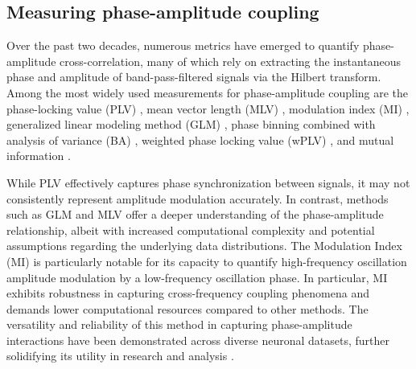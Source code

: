 \documentclass[../main.tex]{subfiles}
\begin{document}
\subsection{Measuring phase-amplitude coupling} 
Over the past two decades, numerous metrics have emerged to quantify phase-amplitude cross-correlation, many of which rely on extracting the instantaneous phase and amplitude of band-pass-filtered signals via the Hilbert transform.
Among the most widely used measurements for phase-amplitude coupling are the phase-locking value (PLV) \citep{mormann_phaseamplitude_2005, cohen_assessing_2008}, mean vector length (MLV) \citep{canolty_high_2006}, modulation index (MI) \citep{tort_dynamic_2008}, generalized linear modeling method (GLM) \citep{kramer_assessment_2013}, phase binning combined with analysis of variance (BA) \citep{lakatos_oscillatory_2005}, weighted phase locking value (wPLV) \citep{maris_spatially_2011}, and mutual information \citep{martinez-cancino_measuring_2019}.

While PLV effectively captures phase synchronization between signals, it may not consistently represent amplitude modulation accurately.
In contrast, methods such as GLM and MLV offer a deeper understanding of the phase-amplitude relationship, albeit with increased computational complexity and potential assumptions regarding the underlying data distributions.
The Modulation Index (MI) is particularly notable for its capacity to quantify high-frequency oscillation amplitude modulation by a low-frequency oscillation phase.
In particular, MI exhibits robustness in capturing cross-frequency coupling phenomena and demands lower computational resources compared to other methods.
The versatility and reliability of this method in capturing phase-amplitude interactions have been demonstrated across diverse neuronal datasets, further solidifying its utility in research and analysis \citep{caixeta2013ketamine,fernandez-ruiz_entorhinal-ca3_2017,fernandez2021gamma,lopez-madrona_different_2020}.
\end{document}
